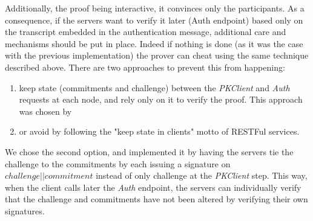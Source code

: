     Additionally, the proof being interactive,
    it convinces only the participants.
    As a consequence, if the servers want to verify it later (Auth endpoint) based only on the transcript embedded in the authentication message, additional care and mechanisms should be put in place.
    Indeed if nothing is done (as it was the case with the previous implementation\cite{villard_deniable_2017}) the prover
    can cheat using the same technique described above.\newline
    There are two approaches to prevent this from happening:
    \begin{enumerate}
        \item keep state (commitments and challenge) between the \emph{PKClient} and \emph{Auth} requests at each node,
                and rely only on it to verify the proof.
                This approach was chosen by~
        \item or avoid by following the "keep state in clients" motto of RESTFul services.
    \end{enumerate}

    We chose the second option, and implemented it by having the servers tie the challenge to the commitments by
    each issuing a signature on \(challenge||commitment\) instead of only challenge at the \emph{PKClient} step.
    This way, when the client calls later the \emph{Auth} endpoint, the servers can individually verify that the challenge
    and commitments have not been altered by verifying their own signatures.



